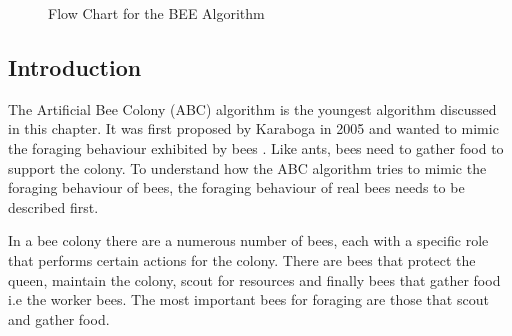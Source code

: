 \begin{figure}[p]
	\begin{center}
	\caption{Flow Chart for the BEE Algorithm}
	\label{fig:BeeAlgorithmFlowChart}
	\end{center}
\end{figure}
\subsection{Introduction}
The Artificial Bee Colony (ABC) algorithm is the youngest algorithm discussed in this chapter\cite{ABCCompareStudy,ABCLeafConstrained,ABCNumericalOptimization}. It was first proposed by Karaboga in 2005 and wanted to mimic the foraging behaviour exhibited by bees \cite{ABCCompareStudy,ABCLeafConstrained,ABCNumericalOptimization}. Like ants, bees need to gather food to support the colony. To understand how the ABC algorithm tries to mimic the foraging behaviour of bees, the foraging behaviour of real bees needs to be described first\cite{ABCCompareStudy}. 

In a bee colony there are a numerous number of bees, each with a specific role that performs certain actions for the colony. There are bees that protect the queen, maintain the colony, scout for resources and finally bees that gather food i.e the worker bees. The most important bees for foraging are those that scout and gather food\cite{ABCCompareStudy}. 

